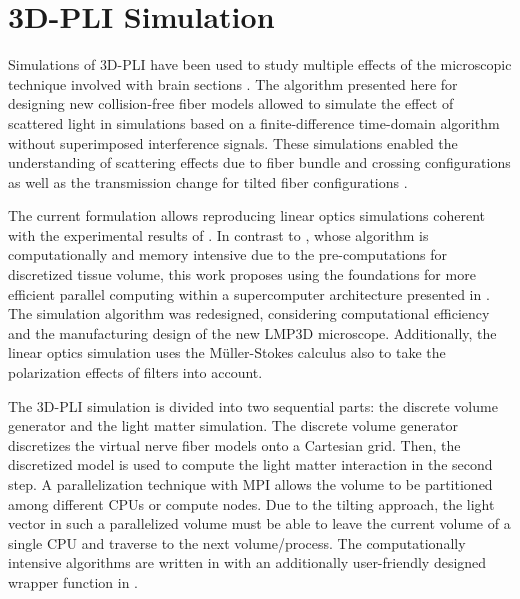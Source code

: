 \cleardoublepage
\setcounter{chapter}{5}
\chapter{\acs{3D-PLI} Simulation}
\label{cha:sof:simulation}
%
Simulations of \ac{3D-PLI} have been used to study multiple effects of the microscopic technique involved with brain sections \cite{Dohmen2015,Menzel2015,Menzel2016,Menzel2020,Menzel2021,MenzelMaster,MenzelDissertation}.
The algorithm presented here for designing new collision-free fiber models allowed to simulate the effect of scattered light in  simulations based on a finite-difference time-domain algorithm without superimposed interference signals.
These simulations enabled the understanding of scattering effects due to fiber bundle and crossing configurations as well as the transmission change for tilted fiber configurations \cite{MenzelDissertation,Menzel2020,Menzel2021}.
\par
%
The current formulation allows reproducing linear optics simulations coherent with the experimental results of \cite{Dohmen2015,Menzel2015,Menzel2016}.
In contrast to \cite{Dohmen2015,Menzel2015,Menzel2016}, whose algorithm is computationally and memory intensive due to the pre-computations for discretized tissue volume, this work proposes using the foundations for more efficient parallel computing within a supercomputer architecture presented in \cite{Lucksch2016}.
The simulation algorithm was redesigned, considering computational efficiency and the manufacturing design of the new \ac{LMP3D} microscope.
Additionally, the linear optics simulation uses the M{\"u}ller-Stokes calculus also to take the polarization effects of filters into account.
\par
%
The \ac{3D-PLI} simulation is divided into two sequential parts: the discrete volume generator and the light matter simulation.
The discrete volume generator discretizes the virtual nerve fiber models onto a Cartesian grid.
Then, the discretized model is used to compute the light matter interaction in the second step.
A parallelization technique with \ac{MPI} allows the volume to be partitioned among different \acp{CPU} or compute nodes.
Due to the tilting approach, the light vector in such a parallelized volume must be able to leave the current volume of a single \ac{CPU} and traverse to the next volume/process.
The computationally intensive algorithms are written in \cpp{} with an additionally user-friendly designed wrapper function in \python{}.
%
%
%
